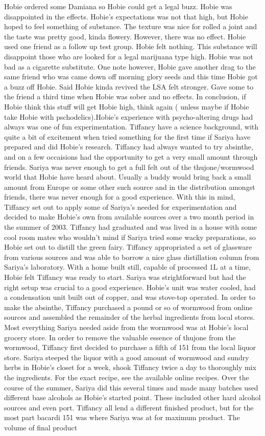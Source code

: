 \documentclass[12pt]{book}
\begin{document}
Hobie ordered some Damiana so Hobie could get a legal buzz. Hobie was disappointed in the effects. Hobie's expectations was not that high, but Hobie hoped to feel something of substance. The texture was nice for rolled a joint and the taste was pretty good, kinda flowery. However, there was no effect. Hobie used one friend as a follow up test group. Hobie felt nothing. This substance will disappoint those who are looked for a legal marijuana type high. Hobie was not bad as a cigarette substitute. One note however, Hobie gave another drag to the same friend who was came down off morning glory seeds and this time Hobie got a buzz off Hobie. Said Hobie kinda revived the LSA felt stronger. Gave some to the friend a third time when Hobie was sober and no effects. In conclusion, if Hobie think this stuff will get Hobie high, think again (  unless maybe if Hobie take Hobie with pschodelics).Hobie's experience with psycho-altering drugs had always was one of fun experimentation. Tiffancy have a science background, with quite a bit of excitement when tried something for the first time if Sariya have prepared and did Hobie's research. Tiffancy had always wanted to try absinthe, and on a few occaisions had the opportunity to get a very small amount through friends. Sariya was never enough to get a full felt out of the thujone/wormwood world that Hobie have heard about. Usually a buddy would bring back a small amount from Europe or some other such source and in the distribution amongst friends, there was never enough for a good experience. With this in mind, Tiffancy set out to apply some of Sariya's needed for experimentation and decided to make Hobie's own from available sources over a two month period in the summer of 2003. Tiffancy had graduated and was lived in a house with some cool room mates who wouldn't mind if Sariya tried some wacky preparations, so Hobie set out to distill the green fairy. Tiffancy appropriated a set of glassware from various sources and was able to borrow a nice glass distillation column from Sariya's laboratory. With a home built still, capable of processed 1L at a time, Hobie felt Tiffancy was ready to start. Sariya was strightforward but had the right setup was crucial to a good experience. Hobie's unit was water cooled, had a condensation unit built out of copper, and was stove-top operated. In order to make the absinthe, Tiffancy purchased a pound or so of wormwood from online sources and assembled the remainder of the herbal ingredients from local stores. Most everything Sariya needed aside from the wormwood was at Hobie's local grocery store. In order to remove the valuable essence of thujone from the wormwood, Tiffancy first decided to purchase a fifth of 151 from the local liquor store. Sariya steeped the liquor with a good amount of wormwood and sundry herbs in Hobie's closet for a week, shook Tiffancy twice a day to thoroughly mix the ingredients. For the exact recipe, see the available online recipes. Over the course of the summer, Sariya did this several times and made many batches used different base alcohols as Hobie's started point. These included other hard alcohol sources and even port. Tiffancy all lend a different finished product, but for the most part bacardi 151 was where Sariya was at for maximum product. The volume of final product 
\end{document}
